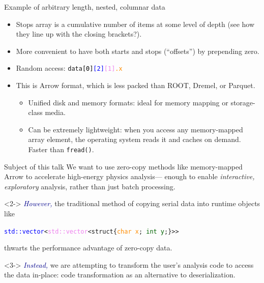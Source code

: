\documentclass[aspectratio=169]{beamer}
\begin{document}
\begin{frame}{Example of arbitrary length, nested, columnar data}
\vspace{0.25 cm}
\begin{itemize}
\item<3-> Stops array is a cumulative number of items at some level of depth (see how they line up with the closing brackets?).
\item<4-> More convenient to have both starts and stops (``offsets'') by prepending zero.
\item<5-> Random access: {\tt\small data\textcolor{black}{[0]}\textcolor{blue}{[2]}\textcolor{violet}{[1]}\textcolor{darkorange}{.x}} 
\item<7-> This is Arrow format, which is less packed than ROOT, Dremel, or Parquet.
\begin{itemize}
\item<8-> Unified disk and memory formats: ideal for memory mapping or storage-class media.
\item<9-> Can be extremely lightweight: when you access any memory-mapped array element, the operating system reads it and caches on demand. Faster than {\tt\small fread()}.
\end{itemize}
\end{itemize}
\end{frame}

\begin{frame}{Subject of this talk}
\vspace{0.5 cm}
We want to use zero-copy methods like memory-mapped Arrow to accelerate high-energy physics analysis--- enough to enable {\it interactive, exploratory} analysis, rather than just batch processing.

\vspace{0.75 cm}
\begin{uncoverenv}<2->
\textcolor{darkblue}{\it However,} the traditional method of copying serial data into runtime objects like
\begin{center}
\tt\small \textcolor{blue}{std::vector}<\textcolor{violet}{std::vector}<struct\{\textcolor{darkorange}{char x}; \textcolor{darkgreen}{int y};\}>>
\end{center}
thwarts the performance advantage of zero-copy data.
\end{uncoverenv}

\vspace{0.75 cm}
\begin{uncoverenv}<3->
\textcolor{darkblue}{\it Instead,} we are attempting to transform the user's analysis code to access the data in-place: code transformation as an alternative to deserialization.
\end{uncoverenv}
\end{frame}
\end{document}
